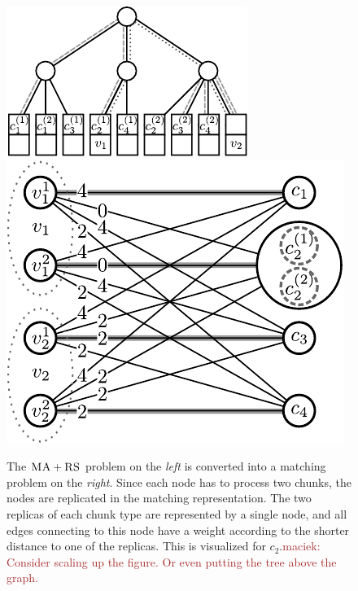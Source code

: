 \documentclass[9pt]{sigcomm-alternate}
\newcommand{\maciek}[1]{\textcolor{brown}{maciek: #1}}
\newcommand{\achunk}{\ensuremath{c}}
\newcommand{\RS}{\textsc{RS}}
\newcommand{\MA}{\textsc{MA}}
\begin{document}
\begin{figure}
\includegraphics[width = 0.49\columnwidth]{figs/model_ma_r_cv_boxes}
\hfill
\includegraphics[width =0.49\columnwidth]{figs/matching}
\caption{The $\MA+\RS$ problem on the \emph{left} is converted into a
matching problem on the \emph{right}. Since each node has to process two
chunks, the
nodes are replicated in the matching representation. The two replicas of each
chunk type are represented by a single node, and all edges connecting to this
node have a weight according to the shorter distance to one of the replicas.
This is visualized for $\achunk_2$.\maciek{Consider scaling up the figure. Or even putting the tree above the graph.}}
\label{fig:matching}
\end{figure}
\end{document}
